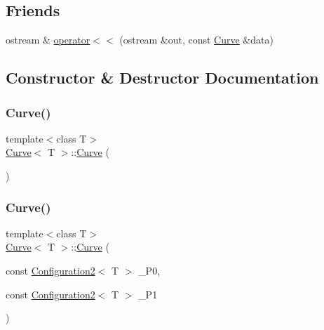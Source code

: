 \subsection*{Friends}
\begin{DoxyCompactItemize}
\item 
ostream \& \mbox{\hyperlink{class_curve_a91af4d37d8aec484114b20623c07058b}{operator$<$$<$}} (ostream \&out, const \mbox{\hyperlink{class_curve}{Curve}} \&data)
\end{DoxyCompactItemize}


\subsection{Constructor \& Destructor Documentation}
\mbox{\label{class_curve_a43ec90b53ea751c2df30ee3688af8a30}} 
\subsubsection{\texorpdfstring{Curve()}{Curve()}\hspace{0.1cm}{\footnotesize\ttfamily [1/4]}}
{\footnotesize\ttfamily template$<$class T$>$ \\
\mbox{\hyperlink{class_curve}{Curve}}$<$ T $>$\+::\mbox{\hyperlink{class_curve}{Curve}} (\begin{DoxyParamCaption}{ }\end{DoxyParamCaption})\hspace{0.3cm}{\ttfamily [inline]}}

\mbox{\label{class_curve_a5e4d06fa2e01878625e9f9c73f8d760b}} 
\subsubsection{\texorpdfstring{Curve()}{Curve()}\hspace{0.1cm}{\footnotesize\ttfamily [2/4]}}
{\footnotesize\ttfamily template$<$class T$>$ \\
\mbox{\hyperlink{class_curve}{Curve}}$<$ T $>$\+::\mbox{\hyperlink{class_curve}{Curve}} (\begin{DoxyParamCaption}\item[{const \mbox{\hyperlink{class_configuration2}{Configuration2}}$<$ T $>$}]{\+\_\+\+P0,  }\item[{const \mbox{\hyperlink{class_configuration2}{Configuration2}}$<$ T $>$}]{\+\_\+\+P1 }\end{DoxyParamCaption})\hspace{0.3cm}{\ttfamily [inline]}}

